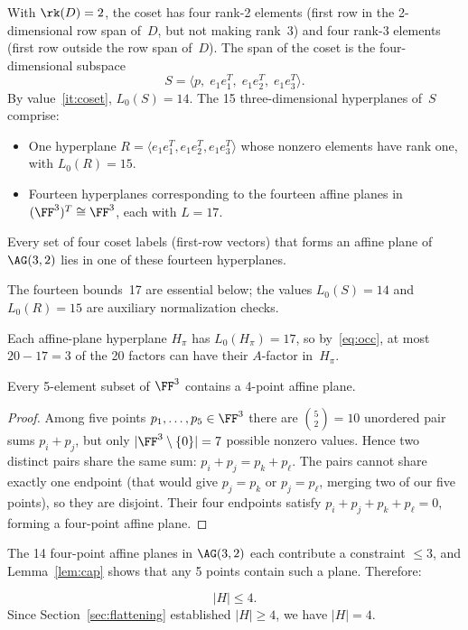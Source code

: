 \documentclass[11pt,a4paper]{article}
\begin{document}
With $\rk(D)=2$, the coset has four rank-2 elements (first row in the 2-dimensional row span of~$D$, but not making rank~3) and four rank-3 elements (first row outside the row span of~$D$).  The span of the coset is the four-dimensional subspace
\[
  S = \langle p,\; e_1e_1^T,\; e_1e_2^T,\; e_1e_3^T\rangle.
\]
By value~\ref{it:coset}, $L_0(S)=14$.  The 15 three-dimensional hyperplanes of~$S$ comprise:
\begin{itemize}
  \item One hyperplane $R=\langle e_1e_1^T,e_1e_2^T,e_1e_3^T\rangle$ whose nonzero elements have rank one, with $L_0(R)=15$.
  \item Fourteen hyperplanes corresponding to the fourteen affine planes in $(\FF^3)^T\cong\FF^3$, each with $L=17$.
\end{itemize}
Every set of four coset labels (first-row vectors) that forms an affine plane of~$\AG(3,2)$ lies in one of these fourteen hyperplanes.

The fourteen bounds~17 are essential below; the values $L_0(S)=14$ and $L_0(R)=15$ are auxiliary normalization checks.

Each affine-plane hyperplane $H_\pi$ has $L_0(H_\pi)=17$, so by~\eqref{eq:occ}, at most $20-17=3$ of the 20 factors can have their $A$-factor in~$H_\pi$.

\begin{lemma}\label{lem:cap}
  Every 5-element subset of $\FF^3$ contains a 4-point affine plane.
\end{lemma}

\begin{proof}
  Among five points $p_1,\ldots,p_5\in\FF^3$ there are $\binom{5}{2}=10$ unordered pair sums $p_i+p_j$, but only $|\FF^3\setminus\{0\}|=7$ possible nonzero values.  Hence two distinct pairs share the same sum: $p_i+p_j=p_k+p_\ell$.  The pairs cannot share exactly one endpoint (that would give $p_j=p_k$ or $p_j=p_\ell$, merging two of our five points), so they are disjoint.  Their four endpoints satisfy $p_i+p_j+p_k+p_\ell=0$, forming a four-point affine plane.
\end{proof}

The 14 four-point affine planes in $\AG(3,2)$ each contribute a constraint $\le 3$, and Lemma~\ref{lem:cap} shows that any 5 points contain such a plane.  Therefore:

\begin{equation}\label{eq:highcount}
  |H|\le 4.
\end{equation}
Since Section~\ref{sec:flattening} established $|H|\ge 4$, we have $|H|=4$.
\end{document}

